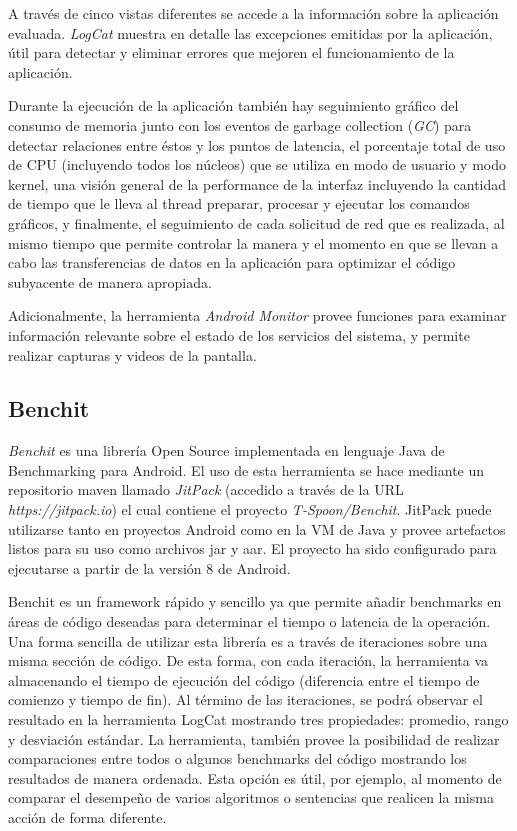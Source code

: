 A través de cinco vistas diferentes se accede a la información sobre
la aplicación evaluada. \emph{LogCat} muestra en detalle las excepciones
emitidas por la aplicación, útil para detectar y eliminar errores
que mejoren el funcionamiento de la aplicación. 

Durante la ejecución de la aplicación también hay seguimiento gráfico
del consumo de memoria junto con los eventos de garbage collection
(\emph{GC}) para detectar relaciones entre éstos y los puntos de latencia,
el porcentaje total de uso de \ac{CPU} (incluyendo todos los núcleos)
que se utiliza en modo de usuario y modo kernel, una visión general
de la performance de la interfaz incluyendo la cantidad de tiempo
que le lleva al thread preparar, procesar y ejecutar los comandos
gráficos, y finalmente, el seguimiento de cada solicitud de red que
es realizada, al mismo tiempo que permite controlar la manera y el
momento en que se llevan a cabo las transferencias de datos en la
aplicación para optimizar el código subyacente de manera apropiada. 

Adicionalmente, la herramienta \emph{Android Monitor} provee funciones
para examinar información relevante sobre el estado de los servicios
del sistema, y permite realizar capturas y videos de la pantalla. 


\subsection{Benchit\label{sub:Benchit}}

\emph{Benchit} es una librería Open Source implementada en lenguaje
Java de Benchmarking para Android. El uso de esta herramienta se hace
mediante un repositorio maven llamado \emph{JitPack} (accedido a través
de la URL \emph{https://jitpack.io}) el cual contiene el proyecto
\emph{T-Spoon/Benchit}. JitPack puede utilizarse tanto en proyectos
Android como en la \ac{VM} de Java y provee artefactos listos para
su uso como archivos jar y aar. El proyecto ha sido configurado para
ejecutarse a partir de la versión 8 de Android. 

Benchit es un framework rápido y sencillo ya que permite añadir benchmarks
en áreas de código deseadas para determinar el tiempo o latencia de
la operación. Una forma sencilla de utilizar esta librería es a través
de iteraciones sobre una misma sección de código. De esta forma, con
cada iteración, la herramienta va almacenando el tiempo de ejecución
del código (diferencia entre el tiempo de comienzo y tiempo de fin).
Al término de las iteraciones, se podrá observar el resultado en la
herramienta LogCat mostrando tres propiedades: promedio, rango y desviación
estándar. La herramienta, también provee la posibilidad de realizar
comparaciones entre todos o algunos benchmarks del código mostrando
los resultados de manera ordenada. Esta opción es útil, por ejemplo,
al momento de comparar el desempeño de varios algoritmos o sentencias
que realicen la misma acción de forma diferente. 


